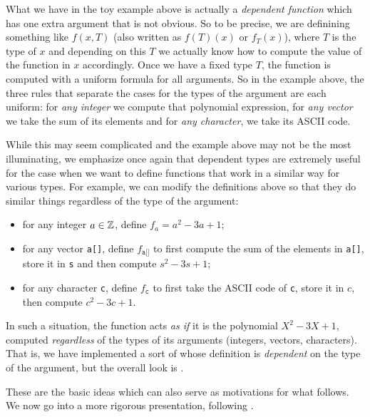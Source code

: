 What we have  in the toy example above is actually a
\emph{dependent function} which has one extra argument that is not obvious.
So to be precise, we are definining something like $ f(x, T) $
(also written as $ f(T)(x) $ or $ f_T(x) $), where $ T $ is the type of $ x $
and depending on this $ T $ we actually know how to compute the value
of the function in $ x $ accordingly. Once we have a fixed type $ T $,
the function is computed with a uniform formula for all arguments.
So in the example above, the three rules that separate the cases for the
types of the argument are each uniform: for \emph{any integer} we compute
that polynomial expression, for \emph{any vector} we take the sum of
its elements and for \emph{any character}, we take its ASCII code.

While this may seem complicated and the example above may not be the most
illuminating, we emphasize once again that dependent types are extremely
useful for the case when we want to define functions that work in a similar
way for various types. For example, we can modify the definitions above
so that they do similar things regardless of the type of the argument:
\begin{itemize}
\item for any integer $ a \in \mathbb{Z} $, define $ f_a = a^2 - 3a + 1 $;
\item for any vector \texttt{a[]}, define $ f_{\texttt{a[]}} $ to first compute
  the sum of the elements in \texttt{a[]}, store it in \texttt{s}
  and then compute $ s^2 - 3s + 1 $;
\item for any character \texttt{c}, define $ f_{\texttt{c}} $ to first take the
  ASCII code of \texttt{c}, store it in $ c $, then compute
  $ c^2 - 3c + 1 $.
\end{itemize}

In such a situation, the function acts \emph{as if} it is the polynomial
$ X^2 - 3X + 1 $, computed \emph{regardless} of the types of its arguments
(integers, vectors, characters). That is, we have implemented a sort of
 whose definition is \emph{dependent} on the type
of the argument, but the overall look is .

\vspace{0.3cm}

These are the basic ideas which can also serve as motivations for what
follows. We now go into a more rigorous presentation, following
\cite{rijke}.

